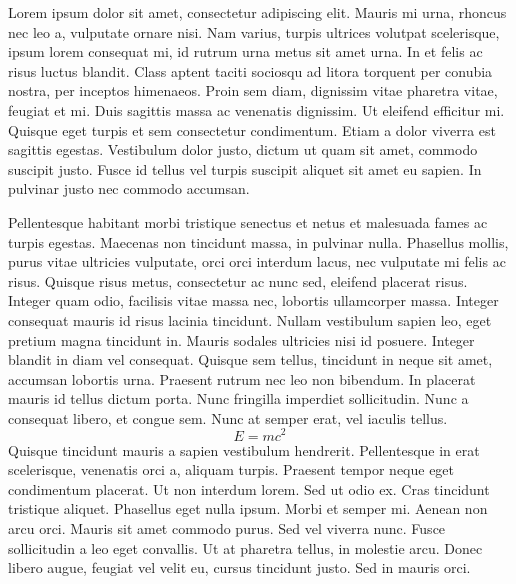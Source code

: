 \documentclass[11pt]{article}
\begin{document}
Lorem ipsum dolor sit amet, consectetur adipiscing elit. Mauris mi urna,
rhoncus nec leo a, vulputate ornare nisi. Nam varius, turpis ultrices
volutpat scelerisque, ipsum lorem consequat mi, id rutrum urna metus sit
amet urna. In et felis ac risus luctus blandit. Class aptent taciti
sociosqu ad litora torquent per conubia nostra, per inceptos himenaeos.
Proin sem diam, dignissim vitae pharetra vitae, feugiat et mi. Duis
sagittis massa ac venenatis dignissim. Ut eleifend efficitur mi. Quisque
eget turpis et sem consectetur condimentum. Etiam a dolor viverra est
sagittis egestas. Vestibulum dolor justo, dictum ut quam sit amet,
commodo suscipit justo. Fusce id tellus vel turpis suscipit aliquet sit
amet eu sapien. In pulvinar justo nec commodo accumsan.

Pellentesque habitant morbi tristique senectus et netus et malesuada fames ac
turpis egestas. Maecenas non tincidunt massa, in pulvinar nulla. Phasellus
mollis, purus vitae ultricies vulputate, orci orci interdum lacus, nec
vulputate mi felis ac risus. Quisque risus metus, consectetur ac nunc sed,
eleifend placerat risus. Integer quam odio, facilisis vitae massa nec, lobortis
ullamcorper massa. Integer consequat mauris id risus lacinia tincidunt. Nullam
vestibulum sapien leo, eget pretium magna tincidunt in. Mauris sodales
ultricies nisi id posuere. Integer blandit in diam vel consequat. Quisque sem
tellus, tincidunt in neque sit amet, accumsan lobortis urna. Praesent rutrum
nec leo non bibendum. In placerat mauris id tellus dictum porta. Nunc fringilla
imperdiet sollicitudin. Nunc a consequat libero, et congue sem. Nunc at semper
erat, vel iaculis tellus.\begin{equation*}E=mc^{2}\end{equation*} Quisque tincidunt mauris a sapien vestibulum hendrerit. Pellentesque in erat scelerisque, venenatis orci a, aliquam turpis. Praesent tempor neque eget condimentum placerat. Ut non interdum lorem. Sed ut odio ex. Cras tincidunt tristique aliquet. Phasellus eget nulla ipsum. Morbi et semper mi. Aenean non arcu orci. Mauris sit amet commodo purus. Sed vel viverra nunc. Fusce sollicitudin a leo eget convallis. Ut at pharetra tellus, in molestie arcu. Donec libero augue, feugiat vel velit eu, cursus tincidunt justo. Sed in mauris orci.
\end{document}
